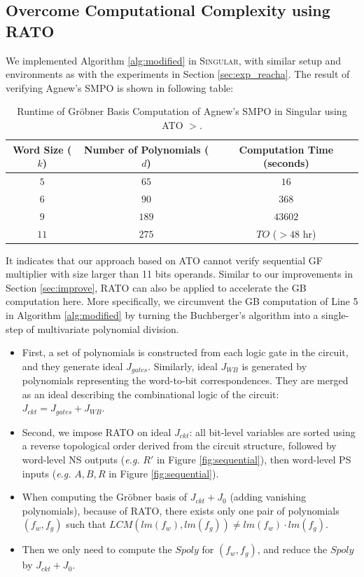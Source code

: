 \subsection{Overcome Computational Complexity using RATO}
We implemented Algorithm \ref{alg:modified} in \textsc{Singular}, with similar setup and environments as
with the experiments in Section \ref{sec:exp_reacha}. The result of verifying Agnew's SMPO is shown 
in following table:

\begin{table}[H]
\begin{center}
	    \caption{Runtime of Gr\"obner Basis Computation of Agnew's SMPO in Singular using ATO $>$.}\label{tab:slimgb}
	    \begin{tabular}{|c|c||c|} 
	        \hline
		Word Size ($k$) & Number of Polynomials ($d$) & Computation Time (seconds)   \\
		\hline
	        $5$	&  $65$  & $16$ \\
	        $6$ &  $90$  & $368$ \\
	        $9$ &  $189$ & $43602$ \\
		$11$	&  $275$  & $TO$ ($>48$ hr)  \\
	        \hline
	    \end{tabular}
	\end{center} 
\end{table}

It indicates that our approach based on ATO cannot verify sequential GF multiplier with size larger than 11 bits operands.
Similar to our improvements in Section \ref{sec:improve}, RATO \cite{TimDAC} can also be applied to 
accelerate the GB computation here. More specifically, we circumvent the GB computation 
of Line 5 in Algorithm \ref{alg:modified} by turning the Buchberger's algorithm 
into a single-step of multivariate polynomial division.

\begin{itemize}
\item First, a set of polynomials is constructed from each logic gate in the circuit, and they generate 
ideal $J_{gates}$. Similarly, ideal $J_{WB}$ is generated by polynomials representing the word-to-bit correspondences.
They are merged as an ideal describing the combinational logic of the circuit: $J_{ckt} = J_{gates} + J_{WB}$.
\item Second, we impose RATO on ideal $J_{ckt}$: all bit-level variables are sorted using a reverse topological order
derived from the circuit structure, followed by word-level NS outputs ({\it e.g.} $R'$ in Figure \ref{fig:sequential}), 
then word-level PS inputs ({\it e.g.} $A,B,R$ in Figure \ref{fig:sequential}).
\item When computing the Gr\"obner basis of $J_{ckt}+J_0$ (adding vanishing polynomials), because of 
RATO, there exists only one pair of polynomials $(f_w,f_g)$ such that $LCM(lm(f_w),lm(f_g)) \neq lm(f_w)\cdot lm(f_g)$.
\item Then we only need to compute the $Spoly$ for $(f_w,f_g)$, and reduce the $Spoly$ by $J_{ckt}+J_0$.
\end{itemize}


